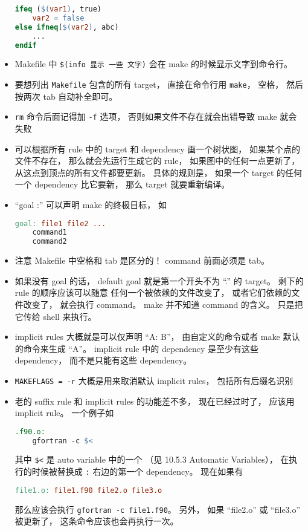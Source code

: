 \begin{itemize}
\begin{lstlisting}[language=makefile]
ifeq ($(var1), true)
    var2 = false
else ifneq($(var2), abc)
    ...
endif
\end{lstlisting}
\item Makefile 中 \verb`$(info 显示 一些 文字)` 会在 make 的时候显示文字到命令行。
\item 要想列出 \verb`Makefile` 包含的所有 target， 直接在命令行用 \verb`make`， 空格， 然后按两次 tab 自动补全即可。
\item \verb`rm` 命令后面记得加 \verb`-f` 选项， 否则如果文件不存在就会出错导致 make 就会失败
\item 可以根据所有 rule 中的 target 和 dependency 画一个树状图， 如果某个点的文件不存在， 那么就会先运行生成它的 rule， 如果图中的任何一点更新了， 从这点到顶点的所有文件都要更新。 具体的规则是， 如果一个 target 的任何一个 dependency 比它要新， 那么 target 就要重新编译。
\item “goal :” 可以声明 make 的终极目标， 如
\begin{lstlisting}[language=makefile]
goal: file1 file2 ...
	command1
	command2
\end{lstlisting}
\item 注意 Makefile 中空格和 tab 是区分的！ command 前面必须是 tab。
\item 如果没有 goal 的话， default goal 就是第一个开头不为 “.” 的 target。 剩下的 rule 的顺序应该可以随意
任何一个被依赖的文件改变了， 或者它们依赖的文件改变了， 就会执行 command。 make 并不知道 command 的含义。 只是把它传给 shell 来执行。
\item implicit rules 大概就是可以仅声明 “A: B”， 由自定义的命令或者 make 默认的命令来生成 “A”。 implicit rule 中的 dependency 是至少有这些 dependency， 而不是只能有这些 dependency。
\item \verb`MAKEFLAGS = -r` 大概是用来取消默认 implicit rules， 包括所有后缀名识别
\item 老的 suffix rule 和 implicit rules 的功能差不多， 现在已经过时了， 应该用 implicit rule。 一个例子如
\begin{lstlisting}[language=makefile]
.f90.o:
	gfortran -c $<
\end{lstlisting}
其中 \verb`$<` 是 auto variable 中的一个 （见 10.5.3 Automatic Variables）， 在执行的时候被替换成 \verb`:` 右边的第一个 dependency。 现在如果有
\begin{lstlisting}[language=makefile]
file1.o: file1.f90 file2.o file3.o
\end{lstlisting}
那么应该会执行 \verb`gfortran -c file1.f90`。 另外， 如果 “file2.o” 或 “file3.o” 被更新了， 这条命令应该也会再执行一次。

\end{itemize}
